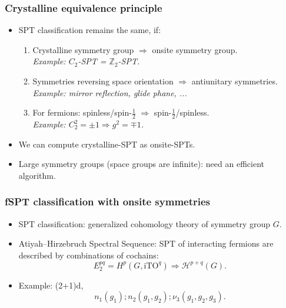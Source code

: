 \documentclass[xcolor=table, 11pt, aspectratio=169]{beamer}
\begin{document}
\begin{frame}
  \frametitle{Crystalline equivalence principle}
  \begin{itemize}
  \item SPT classification remains the same, if:
    \begin{enumerate}
    \item Crystalline symmetry group $\Rightarrow$ onsite symmetry group.\\
      \emph{Example: $C_2$-SPT = $\mathbb Z_2$-SPT.}
    \item Symmetries reversing space orientation $\Rightarrow$ antiunitary symmetries.\\
      \emph{Example: mirror reflection, glide phane, ...}
    \item For fermions: spinless/spin-$\frac12$ $\Rightarrow$ spin-$\frac12$/spinless.\\
      \emph{Example: $C_2^2=\pm1 \Rightarrow g^2=\mp1$.}
    \end{enumerate}
  \item We can compute crystalline-SPT as onsite-SPTs.
  \item Large symmetry groups (space groups are infinite): need an efficient algorithm.
  \end{itemize}
  \begin{center}
  \end{center}
\end{frame}

\begin{frame}
  \frametitle{fSPT classification with onsite symmetries}
  \begin{itemize}
    \item<1-> SPT classification: generalized cohomology theory of symmetry group $G$.
    \item<1-> Atiyah–Hirzebruch Spectral Sequence: SPT of interacting fermions are described by combinations of cochains:
      \[E^{pq}_2=H^p(G, \text{iTO}^q)\Rightarrow
      \mathcal H^{p+q}(G).\]
    \item Example: (2+1)d,
      \[n_1(g_1); n_2(g_1, g_2); \nu_3(g_1,g_2,g_3).\]
  \end{itemize}
\end{frame}
\end{document}
